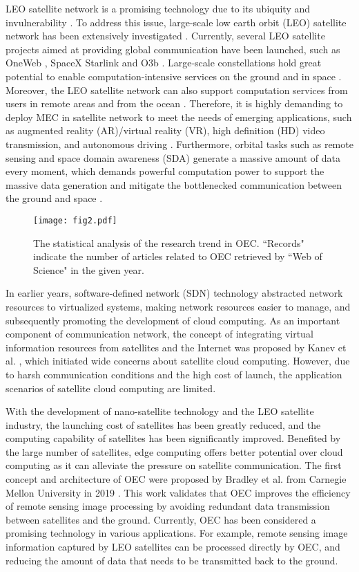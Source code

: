 \documentclass[lettersize,journal]{IEEEtran}
\begin{document}
LEO satellite network is a promising technology due to its ubiquity and invulnerability \cite{RN77}. To address this issue, large-scale low earth orbit (LEO) satellite network has been extensively investigated \cite{RN88}. Currently, several LEO satellite projects aimed at providing global communication have been launched, such as OneWeb \cite{RN144}, SpaceX Starlink \cite{RN146} and O3b \cite{RN147}. Large-scale constellations hold great potential to enable computation-intensive services on the ground and in space \cite{RN77}. Moreover, the LEO satellite network can also support computation services from users in remote areas and from the ocean \cite{RN255}. Therefore, it is highly demanding to deploy MEC in satellite network to meet the needs of emerging applications, such as augmented reality (AR)/virtual reality (VR), high definition (HD) video transmission, and autonomous driving \cite{RN55}. Furthermore, orbital tasks such as remote sensing and space domain awareness (SDA) \cite{RN148} generate a massive amount of data every moment, which demands powerful computation power to support the massive data generation and  mitigate the bottlenecked communication between the ground and space \cite{RN13}.


\IEEEpubidadjcol

\begin{figure}
  \centering
  \texttt{[image: fig2.pdf]}
  \caption{The statistical analysis of the research trend in OEC. ``Records" indicate the number of articles related to OEC retrieved by ``Web of Science" in the given year.}
  \label{Fig1}
\end{figure}

In earlier years, software-defined network (SDN) technology abstracted network resources to virtualized systems, making network resources easier to manage, and subsequently promoting the development of cloud computing. As an important component of communication network, the concept of integrating virtual information resources from satellites and the Internet was proposed by Kanev et al. \cite{RN180}, which initiated wide concerns about satellite cloud computing. However, due to harsh communication conditions and the high cost of launch, the application scenarios of satellite cloud computing are limited. 

With the development of nano-satellite technology and the LEO satellite industry, the launching cost of satellites has been greatly reduced, and the computing capability of satellites has been significantly improved. Benefited by the large number of satellites, edge computing offers better potential over cloud computing as it can alleviate the pressure on satellite communication. The first concept and architecture of OEC were proposed by Bradley et al. from Carnegie Mellon University in 2019 \cite{RN57, RN180}. This work validates that OEC improves the efficiency of remote sensing image processing by avoiding redundant data transmission between satellites and the ground. Currently, OEC has been considered a promising technology in various applications. For example, remote sensing image information captured by LEO satellites can be processed directly by OEC, and reducing the amount of data that needs to be transmitted back to the ground.
\end{document}
